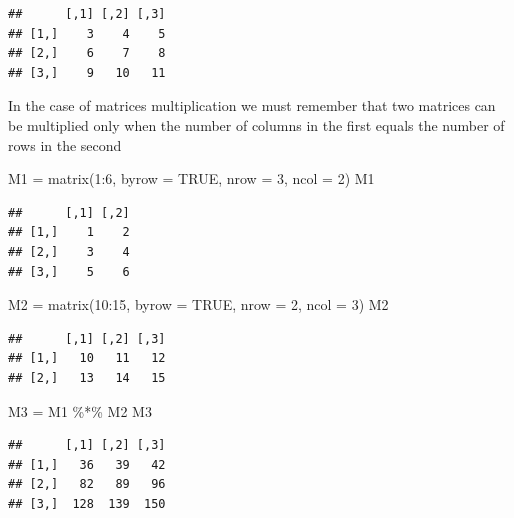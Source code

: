 \documentclass[
]{book}
\newenvironment{Shaded}{\begin{snugshade}}{\end{snugshade}}
\newcommand{\AttributeTok}[1]{\textcolor[rgb]{0.77,0.63,0.00}{#1}}
\newcommand{\ConstantTok}[1]{\textcolor[rgb]{0.00,0.00,0.00}{#1}}
\newcommand{\DecValTok}[1]{\textcolor[rgb]{0.00,0.00,0.81}{#1}}
\newcommand{\FunctionTok}[1]{\textcolor[rgb]{0.00,0.00,0.00}{#1}}
\newcommand{\NormalTok}[1]{#1}
\newcommand{\OtherTok}[1]{\textcolor[rgb]{0.56,0.35,0.01}{#1}}
\newcommand{\SpecialCharTok}[1]{\textcolor[rgb]{0.00,0.00,0.00}{#1}}
\begin{document}
\begin{verbatim}
##      [,1] [,2] [,3]
## [1,]    3    4    5
## [2,]    6    7    8
## [3,]    9   10   11
\end{verbatim}

In the case of matrices multiplication we must remember that two matrices can be multiplied only when the number of columns in the first equals the number of rows in the second

\begin{Shaded}
\begin{Highlighting}[]
\NormalTok{M1 }\OtherTok{=} \FunctionTok{matrix}\NormalTok{(}\DecValTok{1}\SpecialCharTok{:}\DecValTok{6}\NormalTok{, }\AttributeTok{byrow =} \ConstantTok{TRUE}\NormalTok{, }\AttributeTok{nrow =} \DecValTok{3}\NormalTok{, }\AttributeTok{ncol =} \DecValTok{2}\NormalTok{)}
\NormalTok{M1}
\end{Highlighting}
\end{Shaded}

\begin{verbatim}
##      [,1] [,2]
## [1,]    1    2
## [2,]    3    4
## [3,]    5    6
\end{verbatim}

\begin{Shaded}
\begin{Highlighting}[]
\NormalTok{M2 }\OtherTok{=} \FunctionTok{matrix}\NormalTok{(}\DecValTok{10}\SpecialCharTok{:}\DecValTok{15}\NormalTok{, }\AttributeTok{byrow =} \ConstantTok{TRUE}\NormalTok{, }\AttributeTok{nrow =} \DecValTok{2}\NormalTok{, }\AttributeTok{ncol =} \DecValTok{3}\NormalTok{)}
\NormalTok{M2}
\end{Highlighting}
\end{Shaded}

\begin{verbatim}
##      [,1] [,2] [,3]
## [1,]   10   11   12
## [2,]   13   14   15
\end{verbatim}

\begin{Shaded}
\begin{Highlighting}[]
\NormalTok{M3 }\OtherTok{=}\NormalTok{ M1 }\SpecialCharTok{\%*\%}\NormalTok{ M2}
\NormalTok{M3}
\end{Highlighting}
\end{Shaded}

\begin{verbatim}
##      [,1] [,2] [,3]
## [1,]   36   39   42
## [2,]   82   89   96
## [3,]  128  139  150
\end{verbatim}
\end{document}
